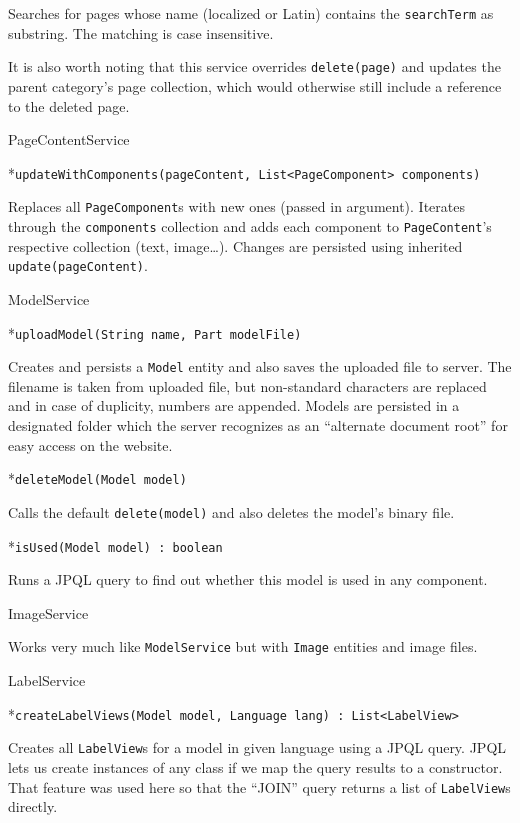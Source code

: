 Searches for pages whose name (localized or Latin) contains the {\tt searchTerm} as substring. The matching is case insensitive.

\enditems

It is also worth noting that this service overrides {\tt delete(page)} and updates the parent category’s page collection, which would otherwise still include a reference to the deleted page.

\secc PageContentService

\begitems

*{\tt updateWithComponents(pageContent, List<PageComponent> components)}

Replaces all {\tt PageComponent}s with new ones (passed in argument). Iterates through the {\tt components} collection and adds each component to {\tt PageContent}’s respective collection (text, image…). Changes are persisted using inherited {\tt update(pageContent)}.

\enditems

\secc ModelService

\begitems

*{\tt uploadModel(String name, Part modelFile)}

Creates and persists a {\tt Model} entity and also saves the uploaded file to server. The filename is taken from uploaded file, but non-standard characters are replaced and in case of duplicity, numbers are appended. Models are persisted in a designated folder which the server recognizes as an “alternate document root” for easy access on the website.

*{\tt deleteModel(Model model)}

Calls the default {\tt delete(model)} and also deletes the model’s binary file.

*{\tt isUsed(Model model) : boolean}

Runs a JPQL query to find out whether this model is used in any component.

\enditems

\secc ImageService

Works very much like {\tt ModelService} but with {\tt Image} entities and image files.

\secc LabelService

\begitems

*{\tt createLabelViews(Model model, Language lang) : List<LabelView>}

Creates all {\tt LabelView}s for a model in given language using a JPQL query. JPQL lets us create instances of any class if we map the query results to a constructor. That feature was used here so that the “JOIN” query returns a list of {\tt LabelView}s directly.

